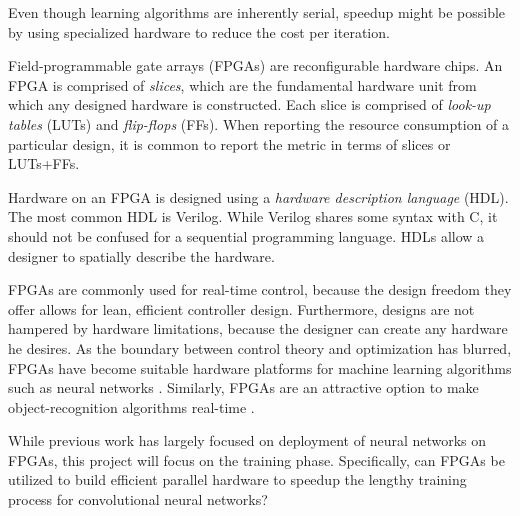 Even though learning algorithms are inherently serial, speedup might be possible by using specialized hardware to reduce the cost per iteration.

Field-programmable gate arrays (FPGAs) are reconfigurable hardware chips. An FPGA is comprised of \textit{slices}, which are the fundamental hardware unit from which any designed hardware is constructed. Each slice is comprised of \textit{look-up tables} (LUTs) and \textit{flip-flops} (FFs). When reporting the resource consumption of a particular design, it is common to report the metric in terms of slices or LUTs+FFs.

Hardware on an FPGA is designed using a \textit{hardware description language} (HDL). The most common HDL is Verilog. While Verilog shares some syntax with C, it should not be confused for a sequential programming language. HDLs allow a designer to spatially describe the hardware.

FPGAs are commonly used for real-time control, because the design freedom they offer allows for lean, efficient controller design. Furthermore, designs are not hampered by hardware limitations, because the designer can create any hardware he desires. As the boundary between control theory and optimization has blurred, FPGAs have become suitable hardware platforms for machine learning algorithms such as neural networks \cite{wang2008} \cite{skodzik2013}. Similarly, FPGAs are an attractive option to make object-recognition algorithms real-time \cite{ahn2015}.

While previous work has largely focused on deployment of neural networks on FPGAs, this project will focus on the training phase. Specifically, can FPGAs be utilized to build efficient parallel hardware to speedup the lengthy training process for convolutional neural networks?